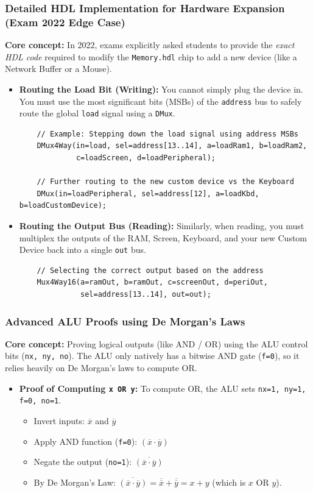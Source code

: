 \documentclass[12pt,a4paper]{article}
\begin{document}
\subsubsection*{Detailed HDL Implementation for Hardware Expansion (Exam 2022 Edge Case)}
\textbf{Core concept:} In 2022, exams explicitly asked students to provide the \textit{exact HDL code} required to modify the \texttt{Memory.hdl} chip to add a new device (like a Network Buffer or a Mouse).
\begin{itemize}
    \item \textbf{Routing the Load Bit (Writing):} You cannot simply plug the device in. You must use the most significant bits (MSBs) of the \texttt{address} bus to safely route the global \texttt{load} signal using a \texttt{DMux}.
    \begin{verbatim}
    // Example: Stepping down the load signal using address MSBs
    DMux4Way(in=load, sel=address[13..14], a=loadRam1, b=loadRam2, 
             c=loadScreen, d=loadPeripheral);
             
    // Further routing to the new custom device vs the Keyboard
    DMux(in=loadPeripheral, sel=address[12], a=loadKbd, b=loadCustomDevice);
    \end{verbatim}
    \item \textbf{Routing the Output Bus (Reading):} Similarly, when reading, you must multiplex the outputs of the RAM, Screen, Keyboard, and your new Custom Device back into a single \texttt{out} bus.
    \begin{verbatim}
    // Selecting the correct output based on the address
    Mux4Way16(a=ramOut, b=ramOut, c=screenOut, d=periOut, 
              sel=address[13..14], out=out);
    \end{verbatim}
\end{itemize}

\subsubsection*{Advanced ALU Proofs using De Morgan's Laws}
\textbf{Core concept:} Proving logical outputs (like AND / OR) using the ALU control bits (\texttt{nx, ny, no}). The ALU only natively has a bitwise AND gate (\texttt{f=0}), so it relies heavily on De Morgan's laws to compute OR.
\begin{itemize}
    \item \textbf{Proof of Computing \texttt{x OR y}:} 
    To compute OR, the ALU sets \texttt{nx=1, ny=1, f=0, no=1}.
    \begin{itemize}
        \item Invert inputs: $\overline{x}$ and $\overline{y}$
        \item Apply AND function (\texttt{f=0}): $(\overline{x} \cdot \overline{y})$
        \item Negate the output (\texttt{no=1}): $\overline{(\overline{x} \cdot \overline{y})}$
        \item By De Morgan's Law: $\overline{(\overline{x} \cdot \overline{y})} = \overline{\overline{x}} + \overline{\overline{y}} = x + y$ (which is $x \text{ OR } y$).
    \end{itemize}
\end{itemize}
\end{document}
